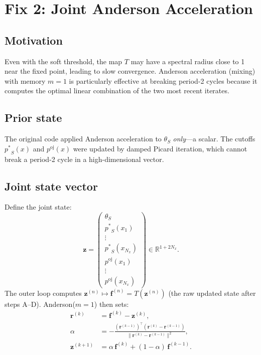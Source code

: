 \documentclass[11pt,a4paper]{article}
\newcommand{\pstar}{\mathord{p^{*}}}
\newcommand{\poj}{\mathord{p^{\mathrm{oj}}}}
\theoremstyle{definition}
\begin{document}
\section{Fix 2: Joint Anderson Acceleration}
\label{sec:anderson}

\subsection{Motivation}

Even with the soft threshold, the map $T$ may have a spectral radius close
to 1 near the fixed point, leading to slow convergence.  Anderson
acceleration (mixing) with memory $m=1$ is particularly effective at
breaking period-2 cycles because it computes the optimal linear combination
of the two most recent iterates.

\subsection{Prior state}

The original code applied Anderson acceleration to $\theta_S$
\emph{only}---a scalar.  The cutoffs $\pstar_S(x)$ and $\poj(x)$ were
updated by damped Picard iteration, which cannot break a period-2 cycle in a
high-dimensional vector.

\subsection{Joint state vector}

Define the joint state:
\[
    \mathbf{z} = \begin{pmatrix}
        \theta_S \\
        \pstar_S(x_1) \\ \vdots \\ \pstar_S(x_{N_x}) \\
        \poj(x_1)     \\ \vdots \\ \poj(x_{N_x})
    \end{pmatrix} \in \mathbb{R}^{1 + 2N_x}.
\]
The outer loop computes
$\mathbf{z}^{(n)} \mapsto \mathbf{f}^{(n)} = T(\mathbf{z}^{(n)})$ (the raw
updated state after steps A--D).  Anderson($m=1$) then sets:
\begin{align}
    \mathbf{r}^{(k)} &= \mathbf{f}^{(k)} - \mathbf{z}^{(k)}, \\
    \alpha &= -\frac{(\mathbf{r}^{(k-1)})^{\top}
                     (\mathbf{r}^{(k)} - \mathbf{r}^{(k-1)})}
                    {\lVert \mathbf{r}^{(k)} - \mathbf{r}^{(k-1)}
                     \rVert^2}, \\
    \mathbf{z}^{(k+1)} &= \alpha\, \mathbf{f}^{(k)}
                        + (1-\alpha)\, \mathbf{f}^{(k-1)}.
\end{align}
\end{document}
